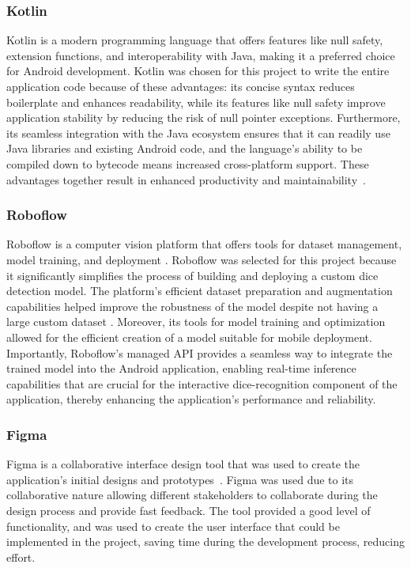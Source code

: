 \subsubsection{Kotlin}
\label{sec:kotlin}
Kotlin is a modern programming language that offers features like null safety, extension functions, and interoperability with Java, making it a preferred choice for Android development. Kotlin was chosen for this project to write the entire application code because of these advantages: its concise syntax reduces boilerplate and enhances readability, while its features like null safety improve application stability by reducing the risk of null pointer exceptions. Furthermore, its seamless integration with the Java ecosystem ensures that it can readily use Java libraries and existing Android code, and the language's ability to be compiled down to bytecode means increased cross-platform support. These advantages together result in enhanced productivity and maintainability~\cite{bib:kotlin}.

\subsubsection{Roboflow}
\label{sec:roboflow}
Roboflow is a computer vision platform that offers tools for dataset management, model training, and deployment \cite{bib:roboflow}. Roboflow was selected for this project because it significantly simplifies the process of building and deploying a custom dice detection model. The platform's efficient dataset preparation and augmentation capabilities helped improve the robustness of the model despite not having a large custom dataset \cite{bib:kavidataset}. Moreover, its tools for model training and optimization allowed for the efficient creation of a model suitable for mobile deployment. Importantly, Roboflow's managed API provides a seamless way to integrate the trained model into the Android application, enabling real-time inference capabilities that are crucial for the interactive dice-recognition component of the application, thereby enhancing the application's performance and reliability.

\subsubsection{Figma}
\label{sec:figma}
Figma is a collaborative interface design tool that was used to create the application's initial designs and prototypes~\cite{bib:figma}. Figma was used due to its collaborative nature allowing different stakeholders to collaborate during the design process and provide fast feedback. The tool provided a good level of functionality, and was used to create the user interface that could be implemented in the project, saving time during the development process, reducing effort.


